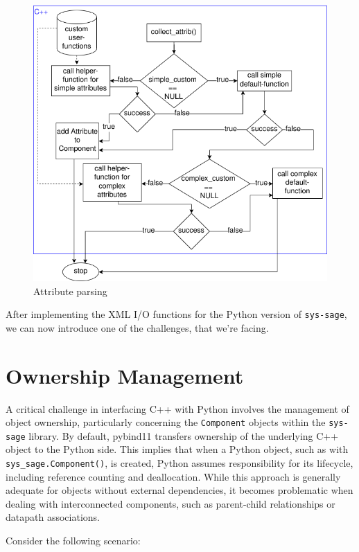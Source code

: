 \begin{figure}[htpb]
    \centering
    \includegraphics[width=\textwidth]{figures/Attribute_from_xml.png}
    \caption{Attribute parsing}
    \label{fig:Attribute parsing}
\end{figure}

After implementing the XML I/O functions for the Python version of \verb|sys-sage|, we can now introduce one of the challenges, that we're facing.
\newpage
\section{Ownership Management}

A critical challenge in interfacing C++ with Python involves the management of object ownership, particularly concerning the \verb|Component| objects within the \verb|sys-sage| library. By default, pybind11 transfers ownership of the underlying C++ object to the Python side. This implies that when a Python object, such as with \verb|sys_sage.Component()|, is created, Python assumes responsibility for its lifecycle, including reference counting and deallocation. While this approach is generally adequate for objects without external dependencies, it becomes problematic when dealing with interconnected components, such as parent-child relationships or datapath associations.

Consider the following scenario:

